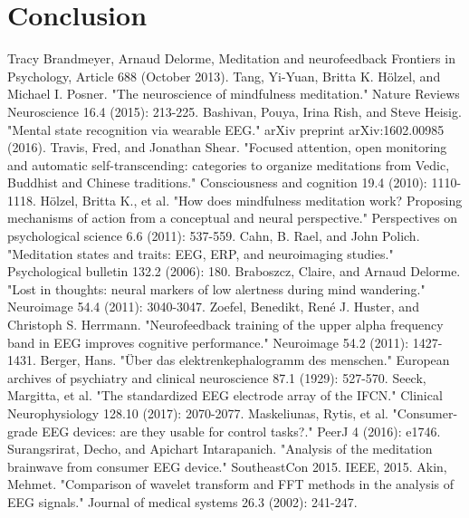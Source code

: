 \documentclass{llncs} %
\begin{document}
\section{Conclusion}


\begin{thebibliography}{[MT1]}
    Tracy Brandmeyer, Arnaud Delorme,
    Meditation and neurofeedback
    Frontiers in Psychology, Article 688 (October 2013).
    Tang, Yi-Yuan, Britta K. Hölzel, and Michael I. Posner. "The neuroscience of mindfulness meditation." Nature Reviews Neuroscience 16.4 (2015): 213-225.
    Bashivan, Pouya, Irina Rish, and Steve Heisig. "Mental state recognition via wearable EEG." arXiv preprint arXiv:1602.00985 (2016).    
    Travis, Fred, and Jonathan Shear. "Focused attention, open monitoring and automatic self-transcending: categories to organize meditations from Vedic, Buddhist and Chinese traditions." Consciousness and cognition 19.4 (2010): 1110-1118.
    Hölzel, Britta K., et al. "How does mindfulness meditation work? Proposing mechanisms of action from a conceptual and neural perspective." Perspectives on psychological science 6.6 (2011): 537-559.
    Cahn, B. Rael, and John Polich. "Meditation states and traits: EEG, ERP, and neuroimaging studies." Psychological bulletin 132.2 (2006): 180.
    Braboszcz, Claire, and Arnaud Delorme. "Lost in thoughts: neural markers of low alertness during mind wandering." Neuroimage 54.4 (2011): 3040-3047.
    Zoefel, Benedikt, René J. Huster, and Christoph S. Herrmann. "Neurofeedback training of the upper alpha frequency band in EEG improves cognitive performance." Neuroimage 54.2 (2011): 1427-1431.
    Berger, Hans. "Über das elektrenkephalogramm des menschen." European archives of psychiatry and clinical neuroscience 87.1 (1929): 527-570.
    Seeck, Margitta, et al. "The standardized EEG electrode array of the IFCN." Clinical Neurophysiology 128.10 (2017): 2070-2077.
    Maskeliunas, Rytis, et al. "Consumer-grade EEG devices: are they usable for control tasks?." PeerJ 4 (2016): e1746.
    Surangsrirat, Decho, and Apichart Intarapanich. "Analysis of the meditation brainwave from consumer EEG device." SoutheastCon 2015. IEEE, 2015.
    Akin, Mehmet. "Comparison of wavelet transform and FFT methods in the analysis of EEG signals." Journal of medical systems 26.3 (2002): 241-247.

\end{thebibliography}
\end{document}
